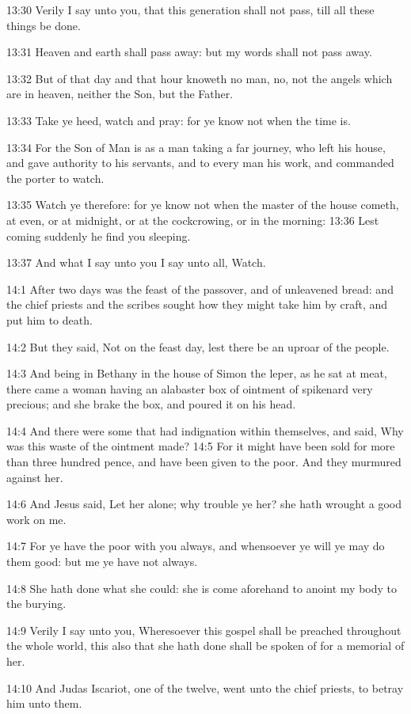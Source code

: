 13:30 Verily I say unto you, that this generation shall not pass, till all these things be done.

13:31 Heaven and earth shall pass away: but my words shall not pass away.

13:32 But of that day and that hour knoweth no man, no, not the angels which are in heaven, neither the Son, but the Father.

13:33 Take ye heed, watch and pray: for ye know not when the time is.

13:34 For the Son of Man is as a man taking a far journey, who left his house, and gave authority to his servants, and to every man his work, and commanded the porter to watch.

13:35 Watch ye therefore: for ye know not when the master of the house cometh, at even, or at midnight, or at the cockcrowing, or in the morning: 13:36 Lest coming suddenly he find you sleeping.

13:37 And what I say unto you I say unto all, Watch.

14:1 After two days was the feast of the passover, and of unleavened bread: and the chief priests and the scribes sought how they might take him by craft, and put him to death.

14:2 But they said, Not on the feast day, lest there be an uproar of the people.

14:3 And being in Bethany in the house of Simon the leper, as he sat at meat, there came a woman having an alabaster box of ointment of spikenard very precious; and she brake the box, and poured it on his head.

14:4 And there were some that had indignation within themselves, and said, Why was this waste of the ointment made?  14:5 For it might have been sold for more than three hundred pence, and have been given to the poor. And they murmured against her.

14:6 And Jesus said, Let her alone; why trouble ye her? she hath wrought a good work on me.

14:7 For ye have the poor with you always, and whensoever ye will ye may do them good: but me ye have not always.

14:8 She hath done what she could: she is come aforehand to anoint my body to the burying.

14:9 Verily I say unto you, Wheresoever this gospel shall be preached throughout the whole world, this also that she hath done shall be spoken of for a memorial of her.

14:10 And Judas Iscariot, one of the twelve, went unto the chief priests, to betray him unto them.

